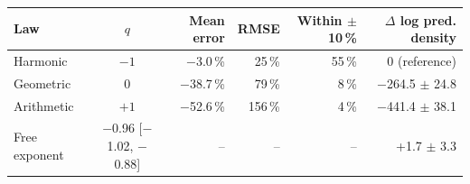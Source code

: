 \begin{tabular}{lcrrrr}
\toprule
Law & $q$ & Mean error & RMSE & Within $\pm$10\,\% & $\Delta$ log pred. density \\
\midrule
Harmonic & $-1$ & \ensuremath{-}3.0\,\% & 25\,\% & 55\,\% & 0 (reference) \\
Geometric & $0$ & \ensuremath{-}38.7\,\% & 79\,\% & 8\,\% & \ensuremath{-}264.5 $\pm$ 24.8 \\
Arithmetic & $+1$ & \ensuremath{-}52.6\,\% & 156\,\% & 4\,\% & \ensuremath{-}441.4 $\pm$ 38.1 \\
Free exponent & \ensuremath{-}0.96 [\ensuremath{-}1.02, \ensuremath{-}0.88] & -- & -- & -- & +1.7 $\pm$ 3.3 \\
\bottomrule
\end{tabular}
